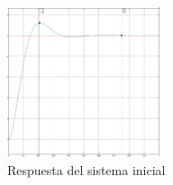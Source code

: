 \begin{figure}[h]
	\centering
	\includegraphics[width=0.4\textwidth]{media/subamortiguado-no-pid}
	\caption{Respuesta del sistema inicial}
	\label{fig:subamortiguado-no-pid}
\end{figure}
